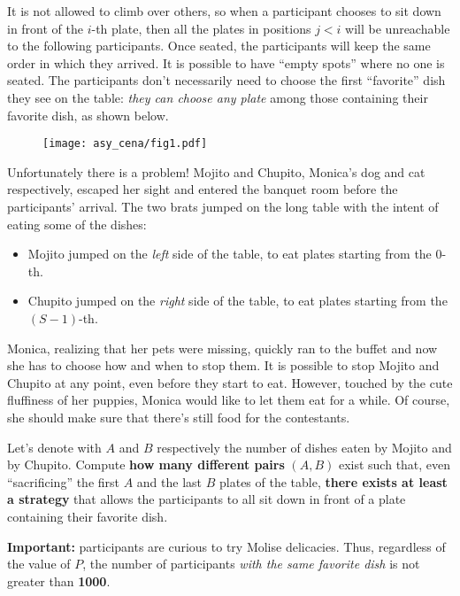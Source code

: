 It is not allowed to climb over others, so when a participant
chooses to sit down in front of the $i$-th plate, then all the plates in
positions $j < i$ will be unreachable to the following participants. Once seated, the
participants will keep the same order in which they arrived. It is possible to
have ``empty spots'' where no one is seated. The participants don't necessarily
need to choose the first ``favorite'' dish they see on the table: \emph{they can
choose any plate} among those containing their favorite dish, as shown below.

\begin{figure}[H]%
	\centering\texttt{[image: asy\_cena/fig1.pdf]}
\end{figure}

Unfortunately there is a problem! Mojito and Chupito, Monica's dog and cat
respectively, escaped her sight and entered the banquet room before the
participants' arrival. The two brats jumped on the long table with the intent of
eating some of the dishes:
\begin{itemize}[nolistsep]
	\item Mojito jumped on the \emph{left} side of the table, to eat plates
  starting from the $0$-th.
	\item Chupito jumped on the \emph{right} side of the table, to eat plates
  starting from the $(S-1)$-th.
\end{itemize}

Monica, realizing that her pets were missing, quickly ran to the buffet and now
she has to choose how and when to stop them. It is possible to stop Mojito and
Chupito at any point, even before they start to eat. However, touched by the cute
fluffiness of her puppies, Monica would like to let them eat for a while. Of course,
she should make sure that there's still food for the contestants.

Let's denote with $A$ and $B$ respectively the number of dishes eaten by Mojito
and by Chupito. Compute \textbf{how many different pairs} $(A, B)$ exist such
that, even ``sacrificing'' the first $A$ and the last $B$ plates of the
table, \textbf{there exists at least a strategy} that allows the participants to
all sit down in front of a plate containing their favorite dish.

\begin{danger}
	\textbf{Important:} participants are curious to try Molise delicacies. Thus,
  	regardless of the value of $P$, the number of participants \emph{with the
  	same favorite dish} is not greater than \textbf{1000}.
\end{danger}

